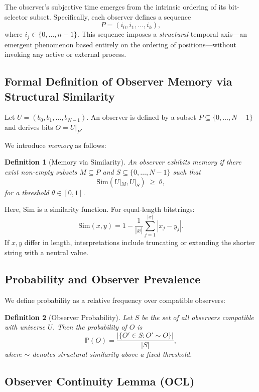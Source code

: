\documentclass[11pt]{article}
\newtheorem{definition}{Definition}
\begin{document}
The observer’s subjective time emerges from the intrinsic ordering of its bit-selector subset. Specifically, each observer defines a sequence
\[
    P = (i_0, i_1, \dots, i_k),
\]
where \(i_j \in \{0,\dots,n-1\}\). This sequence imposes a \emph{structural} temporal axis—an emergent phenomenon based entirely on the ordering of positions—without invoking any active or external process.

\subsection{Formal Definition of Observer Memory via Structural Similarity}

Let \(U = (b_0,b_1,\dots,b_{N-1})\). An observer is defined by a subset \(P\subseteq \{0,\dots,N-1\}\) and derives bits \(O = U|_P\).

We introduce \emph{memory} as follows:

\begin{definition}[Memory via Similarity]
    An observer exhibits memory if there exist non-empty subsets \(M\subseteq P\) and \(S\subseteq \{0,\dots,N-1\}\) such that
    \[
        \mathrm{Sim}(U|_M, U|_S)\;\ge\;\theta,
    \]
    for a threshold \(\theta\in[0,1]\).
\end{definition}

Here, \(\mathrm{Sim}\) is a similarity function. For equal-length bitstrings:
\[
    \mathrm{Sim}(x,y)=1-\frac1{|x|}\sum_{j=1}^{|x|} |x_j-y_j|.
\]
If \(x,y\) differ in length, interpretations include truncating or extending the shorter string with a neutral value.

\subsection{Probability and Observer Prevalence}

We define probability as a relative frequency over compatible observers:

\begin{definition}[Observer Probability]
    Let $S$ be the set of all observers compatible with universe $U$. Then the probability of $O$ is
    \[
        \mathbb{P}(O) = \frac{|\{O' \in S : O' \sim O\}|}{|S|},
    \]
    where $\sim$ denotes structural similarity above a fixed threshold.
\end{definition}

\subsection{Observer Continuity Lemma (OCL)}
\end{document}
